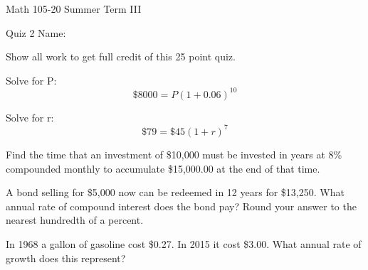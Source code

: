 \documentclass[11pt,epsfig]{article}
\begin{document}
Math 105-20 Summer Term III 

Quiz 2 \hspace{1.9in} {Name:} {\underline {\hspace{3.5in}}}
\vspace{2pc}

Show all work to get full credit of this 25 point quiz.
\vspace{2pc}

\begin{problem}{5}
Solve for P:
\begin{equation*}
\$8000=P{(1+0.06)}^{10}
\end{equation*}
\vfill
\end{problem}

\begin{problem}{5}
Solve for r:
\begin{equation*}
\$79=\$45(1+r)^7
\end{equation*}
\vfill
\end{problem}

\begin{problem}{5}
Find the time that an investment of \$10,000 must be invested in years at 8\% compounded monthly to accumulate \$15,000.00 at the end of that time.

\vfill
\end{problem}

\newpage

\begin{problem}{5}
A bond selling for \$5,000 now can be redeemed in 12 years for \$13,250. What annual rate of compound interest does the bond pay? Round your answer to the nearest hundredth of a percent. 

\vfill
\end{problem}

\begin{problem}{5}
In 1968 a gallon of gasoline cost \$0.27. In 2015 it cost \$3.00. What annual rate of growth does this represent? 
\vfill
\end{problem}

\showpoints
\end{document}
